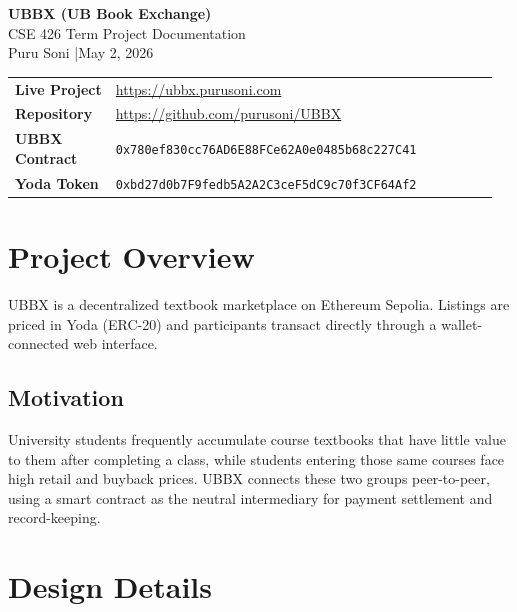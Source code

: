\documentclass[11pt,letterpaper]{article}
\begin{document}
\begin{center}
  {\LARGE\bfseries UBBX (UB Book Exchange)}\\[0.4em]
  {\large CSE 426 Term Project Documentation}\\[0.3em]
  {\normalsize Puru Soni \quad|\quad May 2, 2026}
\end{center}

\vspace{0.4em}
\noindent
\begin{tabular}{@{} >{\bfseries}p{0.20\linewidth}
                    >{\raggedright\arraybackslash}p{0.76\linewidth} @{}}
Live Project   & \url{https://ubbx.purusoni.com} \\
Repository     & \url{https://github.com/purusoni/UBBX} \\
UBBX Contract  & \texttt{0x780ef830cc76AD6E88FCe62A0e0485b68c227C41} \\
Yoda Token     & \texttt{0xbd27d0b7F9fedb5A2A2C3ceF5dC9c70f3CF64Af2} \\
\end{tabular}

\section{Project Overview}

UBBX is a decentralized textbook marketplace on Ethereum Sepolia.
Listings are priced in Yoda (ERC-20) and participants transact directly through
a wallet-connected web interface.

\subsection*{Motivation}

University students frequently accumulate course textbooks that have little value
to them after completing a class, while students entering those same courses face
high retail and buyback prices. UBBX connects these two groups peer-to-peer,
using a smart contract as the neutral intermediary for payment settlement and
record-keeping.

\section{Design Details}
\end{document}
